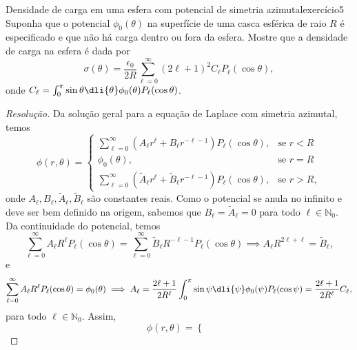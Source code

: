 \begin{exercício}{Densidade de carga em uma esfera com potencial de simetria azimutal}{exercício5}
   Suponha que o potencial \(\phi_0(\theta)\) na superfície de uma casca esférica de raio \(R\) é especificado e que não há carga dentro ou fora da esfera. Mostre que a densidade de carga na esfera é dada por
   \begin{equation*}
       \sigma(\theta) = \frac{\epsilon_0}{2R}\sum_{\ell = 0}^\infty (2\ell + 1)^2 C_\ell P_\ell(\cos\theta),
   \end{equation*}
   onde \(C_\ell = \int_{0}^\pi \sin\theta\dli{\theta}\phi_0(\theta)P_\ell(\cos\theta)\).
\end{exercício}
\begin{proof}[Resolução]
    Da solução geral para a equação de Laplace com simetria azimutal, temos
    \begin{equation*}
        \phi(r, \theta) = \begin{cases}
            \sum_{\ell = 0}^\infty \left(A_\ell r^\ell + B_\ell r^{-\ell -1}\right)P_\ell(\cos\theta), &\text{se } r < R\\
            \phi_0(\theta), &\text{se } r = R\\
            \sum_{\ell = 0}^\infty \left(\tilde{A}_\ell r^\ell + \tilde{B}_\ell r^{-\ell -1}\right)P_\ell(\cos\theta), &\text{se } r > R,
        \end{cases}
    \end{equation*}
    onde \(A_\ell, B_\ell, \tilde{A}_\ell, \tilde{B}_\ell\) são constantes reais. Como o potencial se anula no infinito e deve ser bem definido na origem, sabemos que \(B_\ell = \tilde{A}_\ell = 0\) para todo \(\ell \in \mathbb{N}_0\). Da continuidade do potencial, temos
    \begin{equation*}
        \sum_{\ell = 0}^\infty A_\ell R^\ell P_\ell(\cos\theta) = \sum_{\ell = 0}^\infty \tilde{B}_\ell R^{- \ell - 1}P_\ell(\cos\theta) \implies A_\ell R^{2\ell + \ell} = \tilde{B}_\ell,
    \end{equation*}
    e
    \begin{equation*}
        \sum_{\ell = 0}^\infty A_\ell R^\ell P_\ell(\cos\theta) = \phi_0(\theta) \implies A_\ell = \frac{2\ell + 1}{2R^\ell} \int_0^\pi \sin\psi\dli{\psi} \phi_0(\psi) P_\ell(\cos\psi) = \frac{2\ell + 1}{2R^\ell} C_\ell,
    \end{equation*}
    para todo \(\ell \in \mathbb{N}_0\). Assim,
    \begin{equation*}
        \phi(r, \theta) = \begin{cases}

\end{cases}
\end{equation*}
\end{proof}
